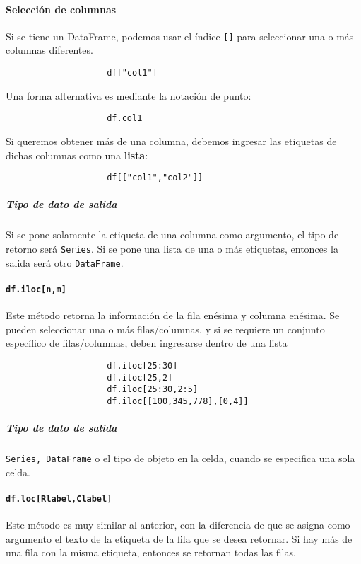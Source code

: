 \paragraph{Selección de columnas}

Si se tiene un DataFrame, podemos usar el índice \texttt{[]} para seleccionar
una o más columnas diferentes.

\begin{verbatim}
                    df["col1"]
                    \end{verbatim}
Una forma alternativa es mediante la notación de punto:

\begin{verbatim}
                    df.col1
                    \end{verbatim}
Si queremos obtener más de una columna, debemos ingresar las etiquetas de
dichas columnas como una \textbf{lista}:
\begin{verbatim}
                    df[["col1","col2"]]
                    \end{verbatim}
\subparagraph{Tipo de dato de salida} Si se pone solamente la etiqueta de una
columna como argumento, el tipo de retorno será \texttt{Series}. Si se pone una
lista de una o más etiquetas, entonces la salida será otro \texttt{DataFrame}.

\paragraph{\texttt{df.iloc[n,m]}} Este método retorna la información de la fila
enésima y columna enésima. Se pueden seleccionar una o más filas/columnas, y si
se requiere un conjunto específico de filas/columnas, deben ingresarse dentro
de una lista
\begin{verbatim}
                    df.iloc[25:30]
                    df.iloc[25,2]
                    df.iloc[25:30,2:5]
                    df.iloc[[100,345,778],[0,4]]
                    \end{verbatim}
\subparagraph{Tipo de dato de salida} \texttt{Series, DataFrame} o el tipo de
objeto en la celda, cuando se especifica una sola celda.

\paragraph{\texttt{df.loc[Rlabel,Clabel]}} Este método es muy similar al
anterior, con la diferencia de que se asigna como argumento el texto de la
etiqueta de la fila que se desea retornar. Si hay más de una fila con la misma
etiqueta, entonces se retornan todas las filas.


